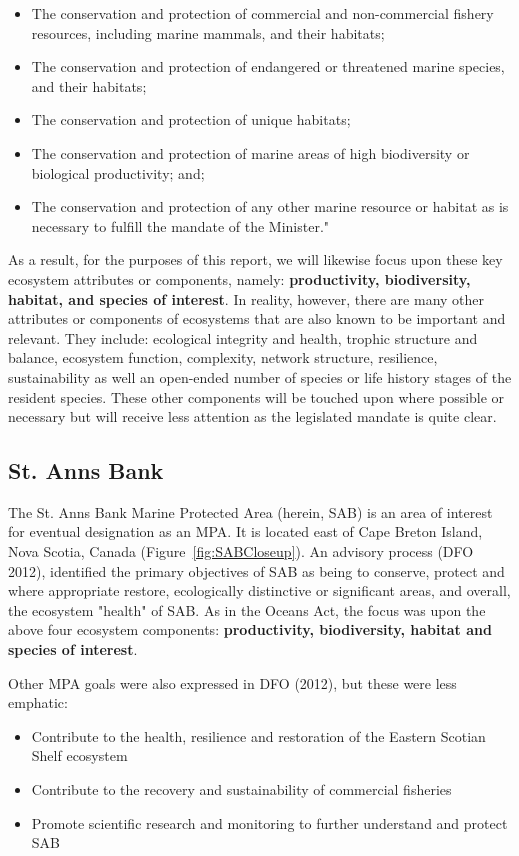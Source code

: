 \documentclass[letterpaper,portrait,11pt]{scrartcl}
\numberwithin{equation}{section}		%
\numberwithin{figure}{section}		%
\numberwithin{table}{section}				%
\begin{document}
\begin{itemize}
  \item The conservation and protection of commercial and non-commercial fishery resources, including marine mammals, and their habitats; 
  \item The conservation and protection of endangered or threatened marine species, and their habitats; 
  \item The conservation and protection of unique habitats; 
  \item The conservation and protection of marine areas of high biodiversity or biological productivity; and; 
  \item The conservation and protection of any other marine resource or habitat as is necessary to fulfill the mandate of the Minister."
\end{itemize}

As a result, for the purposes of this report, we will likewise focus upon these key ecosystem attributes or components, namely: \textbf{productivity, biodiversity, habitat, and  species of interest}. In reality, however, there are many other attributes or components of ecosystems that are also known to be important and relevant. They include: ecological integrity and health, trophic structure and balance, ecosystem function, complexity, network structure, resilience, sustainability as well an open-ended number of species or life history stages of the resident species. These other components will be touched upon where possible or necessary but will receive less attention as the legislated mandate is quite clear. 

\subsection{St. Anns Bank}
The St. Anns Bank Marine Protected Area (herein, SAB) is an area of interest for eventual designation as an MPA. It is located east of Cape Breton Island, Nova Scotia, Canada (Figure~\ref{fig:SABCloseup}). An advisory process (DFO 2012), identified the primary objectives of SAB as being to conserve, protect and where appropriate restore, ecologically distinctive or significant areas, and overall, the ecosystem "health" of SAB. As in the Oceans Act, the focus was upon the above four ecosystem components: \textbf{productivity, biodiversity, habitat and species of interest}.

Other MPA goals were also expressed in DFO (2012), but these were less emphatic:

\begin{itemize}
	\item Contribute to the health, resilience and restoration of the Eastern Scotian Shelf ecosystem
	\item Contribute to the recovery and sustainability of commercial fisheries 
	\item Promote scientific research and monitoring to further understand and protect SAB
\end{itemize}
\end{document}
